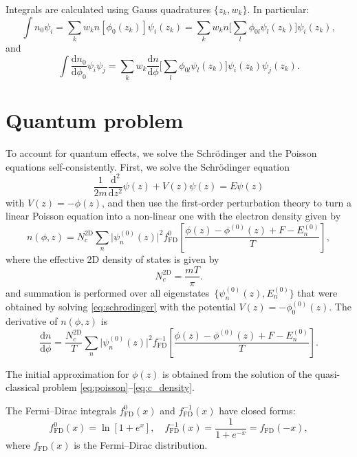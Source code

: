 \documentclass[10pt]{article}
\newcommand{\dd}{\mathrm{d}}
\newcommand{\fFD}{f_{\mathrm{FD}}}
\begin{document}
Integrals are calculated using Gauss quadratures $\{z_k, w_k\}$. In particular:
\begin{equation}
	\int n_0 \psi_i = \sum_k w_k n[\phi_0(z_k)] \psi_i(z_k)
	= \sum_k w_k n\Big[ \sum_l \phi_{0l} \psi_l(z_k) \Big] \psi_i(z_k),
\end{equation}
and
\begin{equation}
	\int \frac{\dd n_0}{\dd \phi_0} \psi_i \psi_j
	= \sum_k w_k \frac{\dd n}{\dd \phi}
		\Big[ \sum_l \phi_{0l} \psi_l(z_k) \Big] \psi_i(z_k) \psi_j(z_k).
\end{equation}

\section{Quantum problem}

To account for quantum effects, we solve the Schr\"odinger and the Poisson
equations self-consistently. First, we solve the Schr\"odinger equation
\begin{equation}
	\label{eq:schrodinger}
	\frac{1}{2m} \frac{\dd^2}{\dd z^2} \psi(z) + V(z) \psi(z) = E \psi(z)
\end{equation}
with $V(z) = -\phi(z)$, and then use the first-order perturbation theory to turn a
linear Poisson equation into a non-linear one with the electron density given by
\begin{equation}
	n(\phi, z) = N_c^\mathrm{2D} \sum_n \lvert\psi_n^{(0)}(z)\rvert^2 \fFD^0
				 \left[ \frac{\phi(z) - \phi^{(0)}(z) + F - E_n^{(0)}}{T} \right],
\end{equation}
where the effective 2D density of states is given by
\begin{equation}
	N_c^\mathrm{2D} = \frac{m T}{\pi}.
\end{equation}
and summation is performed over all eigenstates~$\{ \psi_n^{(0)}(z), E_n^{(0)} \}$
that were obtained by solving \eqref{eq:schrodinger} with the potential
$V(z) = -\phi_0^{(0)}(z)$. The derivative of $n(\phi, z)$ is
\begin{equation}
	\frac{\dd n}{\dd \phi} =
		\frac{N_c^\mathrm{2D}}{T} \sum_n \lvert\psi_n^{(0)}(z)\rvert^2 \fFD^{-1}
		\left[ \frac{\phi(z) - \phi^{(0)}(z) + F - E_n^{(0)}}{T} \right].
\end{equation}

The initial approximation for $\phi(z)$ is obtained from the solution of the
quasi-classical problem \eqref{eq:poisson}--\eqref{eq:c_density}.

The Fermi--Dirac integrals $\fFD^0(x)$ and $\fFD^{-1}(x)$ have closed forms:
\begin{equation}
	\fFD^0(x) = \ln[ 1 + e^x ], \quad
	\fFD^{-1}(x) = \frac{1}{1 + e^{-x}} = f_{\mathrm{FD}}(-x),
\end{equation}
where $f_{\mathrm{FD}}(x)$ is the Fermi--Dirac distribution.
\end{document}
